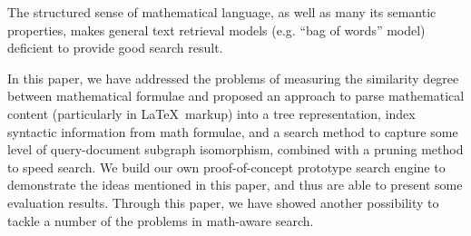 The structured sense of mathematical language, as well as many its semantic properties, makes general text retrieval models (e.g. “bag of words” model) deficient to provide good search result. 

In this paper, we have addressed the problems of measuring the similarity degree between mathematical formulae and proposed an approach to parse mathematical content (particularly in \LaTeX \ markup) into a tree representation, index syntactic information from math formulae, and a search method to capture some level of query-document subgraph isomorphism, combined with a pruning method to speed search. 
We build our own proof-of-concept prototype search engine to demonstrate the ideas mentioned in this paper, and thus are able to present some evaluation results. 
Through this paper, we have showed another possibility to tackle a number of the problems in math-aware search.
